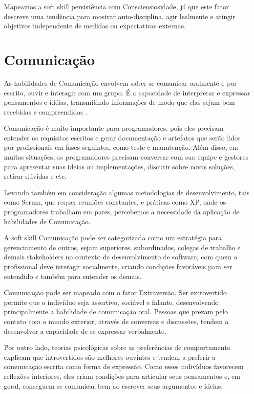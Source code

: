 Mapeamos a soft skill persistência com Consciensiosidade, já que este fator descreve uma tendência para mostrar auto-disciplina, agir lealmente e atingir objetivos independente de medidas ou expectativas externas.

\section{Comunicação}

As habilidades de Comunicação envolvem saber se comunicar oralmente e por escrito, ouvir e interagir com um grupo. É a capacidade de  interpretar e expressar pensamentos e idéias, transmitindo informações de modo que elas sejam bem recebidas e compreendidas \cite{ahmed:12}.

Comunicação é muito importante para programadores, pois eles precisam entender os requisitos escritos e gerar documentação e artefatos que serão lidos por profissionais em fases seguintes, como teste e manutenção. Além disso, em muitas situações, os programadores precisam conversar com sua equipe e gestores para apresentar suas ideias ou implementações, discutir sobre novas soluções, retirar dúvidas e etc.

Levando também em consideração algumas metodologias de desenvolvimento, tais como Scrum, que requer reuniões constantes, e práticas como XP, onde os programadores trabalham em pares, percebemos a necessidade da aplicação de habilidades de Comunicação. 

A soft skill Comunicação pode ser categorizada como um estratégia para gerenciamento de outros, sejam superiores, subordinados, colegas de trabalho e demais stakeholders no contexto de desenvolvimento de software, com quem o profissional deve interagir socialmente, criando condições favoráveis para ser entendido e também para entender os demais.

Comunicação pode ser mapeado com o fator Extraversão. Ser extrovertido permite que o indivíduo seja assertivo, sociável e falante, desenvolvendo principalmente a habilidade de comunicação oral. Pessoas que prezam pelo contato com o mundo exterior, através de conversas e discussões, tendem a desenvolver a capacidade de se expressar verbalmente.

Por outro lado, teorias psicológicas sobre as preferências de comportamento \cite{myers:98} explicam que introvertidos são melhores ouvintes e tendem a preferir a comunicação escrita como forma de expressão. Como esses indivíduos favorecem reflexões interiores, eles criam condições para articular seus pensamentos e, em geral, conseguem se comunicar bem ao escrever seus argumentos e ideias.


